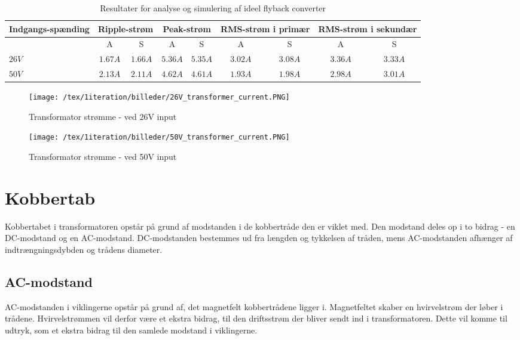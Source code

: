 \begin{table}[H] 			
	\centering
	\begin{tabularx}{\textwidth}{|X|c|c|c|c|c|c|c|c|}
		\hline
		\textbf{Indgangs-spænding} & \multicolumn{2}{|X|}{\textbf{Ripple-strøm}} & \multicolumn{2}{|X|}{\textbf{Peak-strøm}} & \multicolumn{2}{|X|}{\textbf{RMS-strøm i primær}} & \multicolumn{2}{|X|}{\textbf{RMS-strøm i sekundær}} \\ \hline
		& A & S & A & S & A & S & A & S \\ \hline
		$26V$ & $1.67A$ & $1.66A$ & $5.36A$ & $5.35A$ & $3.02A$ & $3.08A$ & $3.36A$ & $3.33A$ \\ \hline 
		$50V$ & $2.13A$ & $2.11A$ & $4.62A$ & $4.61A$ & $1.93A$ & $1.98A$ & $2.98A$ & $3.01A$ \\ \hline
	\end{tabularx}
	\caption{Resultater for analyse og simulering af ideel flyback converter}
	\label{tab:result_ideal_converter}
\end{table}

\begin{figure}[H]
	\center
	\texttt{[image: /tex/1iteration/billeder/26V\_transformer\_current.PNG]}
	\caption{Transformator strømme - ved 26V input}
	\label{fig:26V_transformer_current}
\end{figure}

\begin{figure}[H]
	\center
	\texttt{[image: /tex/1iteration/billeder/50V\_transformer\_current.PNG]}
	\caption{Transformator strømme - ved 50V input}
	\label{fig:50V_transformer_current}
\end{figure}

\section{Kobbertab}
Kobbertabet i transformatoren opstår på grund af modstanden i de kobbertråde den er viklet med. Den modstand deles op i to bidrag - en DC-modstand og en AC-modstand. DC-modstanden bestemmes ud fra længden og tykkelsen af tråden, mens AC-modstanden afhænger af indtrængningsdybden og trådens diameter. 

\subsection{AC-modstand}
AC-modstanden i viklingerne opstår på grund af, det magnetfelt kobbertrådene ligger i. Magnetfeltet skaber en hvirvelstrøm der løber i trådene. Hvirvelstrømmen vil derfor være et ekstra bidrag, til den driftsstrøm der bliver sendt ind i transformatoren. Dette vil komme til udtryk, som et ekstra bidrag til den samlede modstand i viklingerne. 

